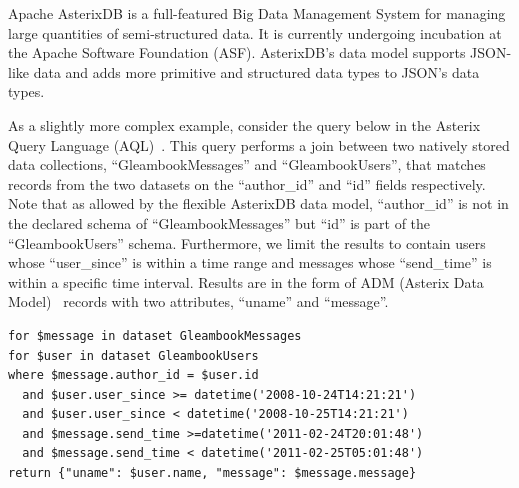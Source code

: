 
Apache AsterixDB is a full-featured Big Data Management System for managing large quantities of semi-structured data. It is currently undergoing incubation at the Apache Software Foundation (ASF). 
AsterixDB's data model supports JSON-like data and adds more primitive and structured data types to JSON's data types.

As a slightly more complex example, consider the query below in the Asterix Query Language (AQL)~\cite{ASTERIX}.
This query performs a join between two natively stored data collections, ``GleambookMessages'' and ``GleambookUsers'',
that matches records from the two datasets on the ``author\_id'' and ``id'' fields respectively. Note that as allowed by the flexible AsterixDB data model,
``author\_id'' is not in the declared schema of ``GleambookMessages''
but ``id'' is part of the ``GleambookUsers'' schema.
Furthermore, we limit the results to contain users whose ``user\_since'' is within a time range and messages whose ``send\_time'' is within a specific time interval. Results are in the form of ADM (Asterix Data Model)~\cite{ASTERIX} records with two attributes, ``uname'' and ``message''. 

\begin{center}
\scriptsize
\begin{lstlisting}
for $message in dataset GleambookMessages
for $user in dataset GleambookUsers
where $message.author_id = $user.id 
  and $user.user_since >= datetime('2008-10-24T14:21:21')
  and $user.user_since < datetime('2008-10-25T14:21:21')
  and $message.send_time >=datetime('2011-02-24T20:01:48')
  and $message.send_time < datetime('2011-02-25T05:01:48')
return {"uname": $user.name, "message": $message.message}
\end{lstlisting}
\end{center}



